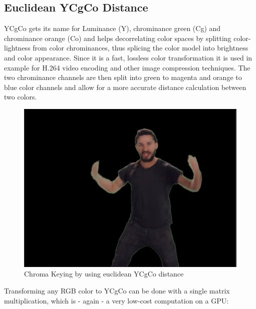 \subsection{Euclidean YCgCo Distance}

YCgCo gets its name for Luminance (Y), chrominance green (Cg) and chrominance 
orange (Co) and helps decorrelating color spaces by splitting color-lightness 
from color chrominances, thus splicing the color model into brightness and 
color appearance. Since it is a fast, lossless color transformation it 
is used in example for H.264 video encoding and other image compression 
techniques. The two chrominance channels are then split into green to magenta 
and orange to blue color channels and allow for a more accurate distance 
calculation between two colors.

\begin{figure}[htb]
	\includegraphics[width=\textwidth]{gfx/distances/chroma-ycgco.png}
	\caption{Chroma Keying by using euclidean YCgCo distance}
	\label{fig:chroma:euclidean:ycgco}
\end{figure}

Transforming any RGB color to YCgCo can be done with a single matrix  
multiplication, which is - again - a very low-cost computation on a GPU:



